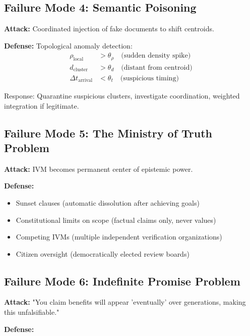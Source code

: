\documentclass[11pt,a4paper]{article}
\theoremstyle{definition}
\theoremstyle{remark}
\begin{document}
\begin{small}
\subsection{Failure Mode 4: Semantic Poisoning}

\textbf{Attack:} Coordinated injection of fake documents to shift centroids.

\textbf{Defense:} Topological anomaly detection:
\begin{align}
\rho_{\text{local}} &> \theta_{\rho} \quad \text{(sudden density spike)}\\
d_{\text{cluster}} &> \theta_d \quad \text{(distant from centroid)}\\
\Delta t_{\text{arrival}} &< \theta_t \quad \text{(suspicious timing)}
\end{align}

Response: Quarantine suspicious clusters, investigate coordination, weighted integration if legitimate.

\subsection{Failure Mode 5: The Ministry of Truth Problem}

\textbf{Attack:} IVM becomes permanent center of epistemic power.

\textbf{Defense:}
\begin{itemize}
\item Sunset clauses (automatic dissolution after achieving goals)
\item Constitutional limits on scope (factual claims only, never values)
\item Competing IVMs (multiple independent verification organizations)
\item Citizen oversight (democratically elected review boards)
\end{itemize}


\subsection{Failure Mode 6: Indefinite Promise Problem}

\textbf{Attack:} "You claim benefits will appear 'eventually' over generations, making this unfalsifiable."

\textbf{Defense:}


\end{small}
\end{document}
